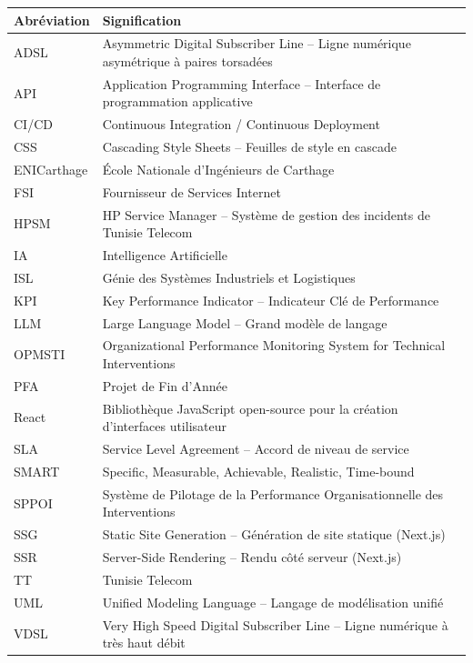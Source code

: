 \documentclass[11pt,a4paper]{report}
\begin{document}
\begin{longtable}{L{3cm} L{11cm}}
\toprule
\textbf{Abréviation} & \textbf{Signification} \\
\midrule
\endhead
\bottomrule
\endfoot
ADSL    & Asymmetric Digital Subscriber Line -- Ligne numérique asymétrique à paires torsadées \\
API     & Application Programming Interface -- Interface de programmation applicative \\
CI/CD   & Continuous Integration / Continuous Deployment \\
CSS     & Cascading Style Sheets -- Feuilles de style en cascade \\
ENICarthage & École Nationale d'Ingénieurs de Carthage \\
FSI     & Fournisseur de Services Internet \\
HPSM    & HP Service Manager -- Système de gestion des incidents de Tunisie Telecom \\
IA      & Intelligence Artificielle \\
ISL     & Génie des Systèmes Industriels et Logistiques \\
KPI     & Key Performance Indicator -- Indicateur Clé de Performance \\
LLM     & Large Language Model -- Grand modèle de langage \\
OPMSTI  & Organizational Performance Monitoring System for Technical Interventions \\
PFA     & Projet de Fin d'Année \\
React   & Bibliothèque JavaScript open-source pour la création d'interfaces utilisateur \\
SLA     & Service Level Agreement -- Accord de niveau de service \\
SMART   & Specific, Measurable, Achievable, Realistic, Time-bound \\
SPPOI   & Système de Pilotage de la Performance Organisationnelle des Interventions \\
SSG     & Static Site Generation -- Génération de site statique (Next.js) \\
SSR     & Server-Side Rendering -- Rendu côté serveur (Next.js) \\
TT      & Tunisie Telecom \\
UML     & Unified Modeling Language -- Langage de modélisation unifié \\
VDSL    & Very High Speed Digital Subscriber Line -- Ligne numérique à très haut débit \\
\end{longtable}
\end{document}
